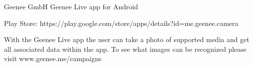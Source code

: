 

\begin{cventries}

  \cventry
    {Geenee GmbH} %
    {Geenee Live app for Android} %
    {} %
    {} %
    {
      \begin{cvitems} %
        \item {Play Store: https://play.google.com/store/apps/details?id=me.geenee.camera}
        \item {With the Geenee Live app the user can take a photo of supported media and get all associated data within the app.
To see what images can be recognized please visit www.geenee.me/campaigns}
      \end{cvitems}
    }

\end{cventries}
